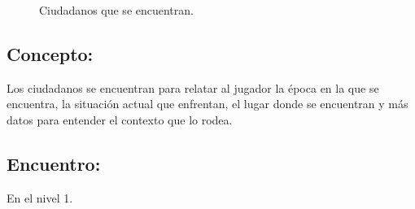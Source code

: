 \begin{figure}
	\caption{Ciudadanos que se encuentran.}
	\label{fig:Ciudadanos}
\end{figure} 
\subsection{Concepto:}
Los ciudadanos se encuentran para relatar al jugador la época en la que se encuentra, la situación actual que enfrentan, el lugar donde se encuentran y más datos para entender el contexto que lo rodea.
\subsection{Encuentro:}
En el nivel 1.
